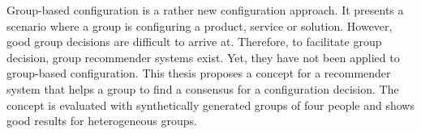 \Abstract

Group-based configuration is a rather new configuration approach. It presents a scenario where a group is configuring a product, service or solution. However, good group decisions are difficult to arrive at. Therefore, to facilitate group decision, group recommender systems exist. Yet, they have not been applied to group-based configuration. This thesis proposes a concept for a recommender system that helps a group to find a consensus for a configuration decision. The concept is evaluated with synthetically generated groups of four people and shows good results for heterogeneous groups.